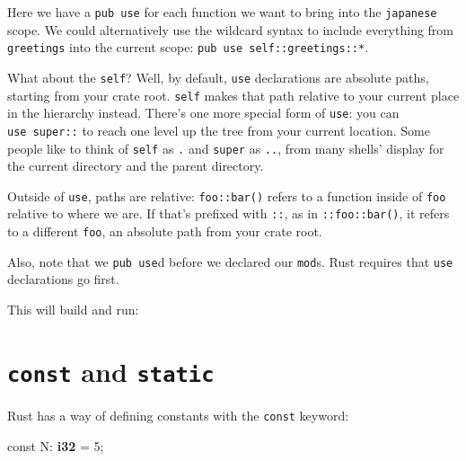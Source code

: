 \documentclass[a4paper,]{book}
\newenvironment{Shaded}{\begin{snugshade}}{\end{snugshade}}
\newcommand{\KeywordTok}[1]{\textcolor[rgb]{0.13,0.29,0.53}{\textbf{{#1}}}}
\newcommand{\DecValTok}[1]{\textcolor[rgb]{0.00,0.00,0.81}{{#1}}}
\newcommand{\NormalTok}[1]{{#1}}
\begin{document}
Here we have a \texttt{pub\ use} for each function we want to bring into
the \texttt{japanese} scope. We could alternatively use the wildcard
syntax to include everything from \texttt{greetings} into the current
scope: \texttt{pub\ use\ self::greetings::*}.

What about the \texttt{self}? Well, by default, \texttt{use}
declarations are absolute paths, starting from your crate root.
\texttt{self} makes that path relative to your current place in the
hierarchy instead. There's one more special form of \texttt{use}: you
can \texttt{use\ super::} to reach one level up the tree from your
current location. Some people like to think of \texttt{self} as
\texttt{.} and \texttt{super} as \texttt{..}, from many shells' display
for the current directory and the parent directory.

Outside of \texttt{use}, paths are relative: \texttt{foo::bar()} refers
to a function inside of \texttt{foo} relative to where we are. If that's
prefixed with \texttt{::}, as in \texttt{::foo::bar()}, it refers to a
different \texttt{foo}, an absolute path from your crate root.

Also, note that we \texttt{pub\ use}d before we declared our
\texttt{mod}s. Rust requires that \texttt{use} declarations go first.

This will build and run:

\begin{Shaded}
\end{Shaded}

\section{\texorpdfstring{\texttt{const} and
\texttt{static}}{const and static}}\label{sec--const-and-static}

Rust has a way of defining constants with the \texttt{const} keyword:

\begin{Shaded}
\begin{Highlighting}[]
\NormalTok{const N: }\KeywordTok{i32} \NormalTok{= }\DecValTok{5}\NormalTok{;}
\end{Highlighting}
\end{Shaded}
\end{document}
